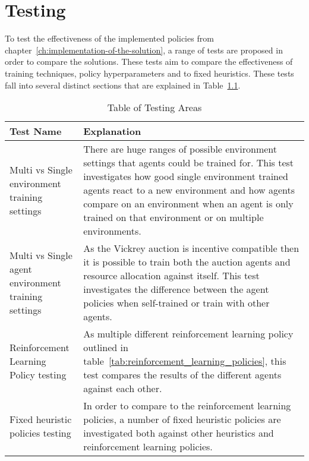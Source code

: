 \chapter{Testing}\label{ch:testing-of-the-implementation}
To test the effectiveness of the implemented policies from chapter~\ref{ch:implementation-of-the-solution}, a range of
tests are proposed in order to compare the solutions. These tests aim to compare the effectiveness of training
techniques, policy hyperparameters and to fixed heuristics. These tests fall into several distinct sections that are
explained in Table~\ref{tab:testing_areas}.

\begin{table}[h]
    \centering
    \begin{tabular}{|l|l|} \hline
        Test Name & Explanation \\ \hline
        Multi vs Single environment training settings & There are huge ranges of possible environment settings that
            agents could be trained for. This test investigates how good single environment trained agents react to
            a new environment and how agents compare on an environment when an agent is only trained on that
            environment or on multiple environments. \\ \hline
        Multi vs Single agent environment training settings & As the Vickrey auction is incentive compatible then it is
            possible to train both the auction agents and resource allocation against itself. This test investigates
            the difference between the agent policies when self-trained or train with other agents. \\ \hline
        Reinforcement Learning Policy testing & As multiple different reinforcement learning policy outlined in
            table~\ref{tab:reinforcement_learning_policies}, this test compares the results of the different agents
            against each other. \\ \hline
        Fixed heuristic policies testing & In order to compare to the reinforcement learning policies, a number of
            fixed heuristic policies are investigated both against other heuristics and reinforcement learning
            policies. \\ \hline
    \end{tabular}
    \caption{Table of Testing Areas}
    \label{tab:testing_areas}
\end{table}
